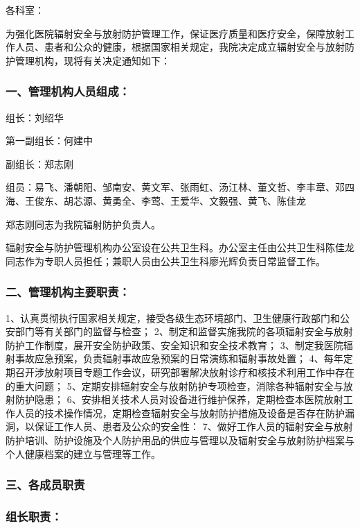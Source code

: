 各科室：

为强化医院辐射安全与放射防护管理工作，保证医疗质量和医疗安全，保障放射工作人员、患者和公众的健康，根据国家相关规定，我院决定成立辐射安全与放射防护管理机构，现将有关决定通知如下：

\subsubsection{一、管理机构人员组成：}

组长：刘绍华

第一副组长：何建中

副组长：郑志刚

组员：易飞、潘朝阳、邹南安、黄文军、张雨虹、汤江林、董文哲、李丰章、邓四海、王俊东、胡芯源、黄勇全、李莺、王爱华、文毅强、黄飞、陈佳龙

郑志刚同志为我院辐射防护负责人。

辐射安全与防护管理机构办公室设在公共卫生科。办公室主任由公共卫生科陈佳龙同志作为专职人员担任；兼职人员由公共卫生科廖光辉负责日常监督工作。

\subsubsection{二、管理机构主要职责：}

1、认真贯彻执行国家相关规定，接受各级生态环境部门、卫生健康行政部门和公安部门等有关部门的监督与检查；
2、制定和监督实施我院的各项辐射安全与放射防护工作制度，展开安全防护政策、安全知识和安全技术教育；
3、制定我医院辐射事故应急预案，负责辐射事故应急预案的日常演练和辐射事故处置；
4、每年定期召开涉放射项目专题工作会议，研究部署解决放射诊疗和核技术利用工作中存在的重大问题；
5、定期安排辐射安全与放射防护专项检查，消除各种辐射安全与放射防护隐患；
6、安排相关技术人员对设备进行维护保养，定期检查本医院放射工作人员的技术操作情况，定期检查辐射安全与放射防护措施及设备是否存在防护漏洞，以保证工作人员、患者及公众的安全性：
7、做好工作人员的辐射安全与放射防护培训、防护设施及个人防护用品的供应与管理以及辐射安全与放射防护档案与个人健康档案的建立与管理等工作。

\subsubsection{三、各成员职责}

\subsubsection{组长职责：}

